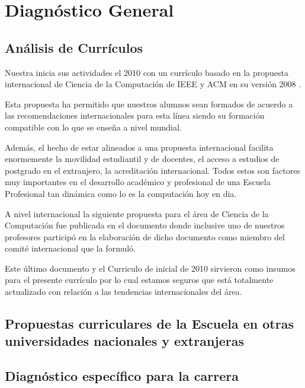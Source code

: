 \section{Diagnóstico General}

\subsection{Análisis de Currí­culos}
Nuestra \SchoolFullName inicia sus actividades el 2010 con un currí­culo basado en la propuesta internacional de 
Ciencia de la Computación de IEEE y ACM en su versión 2008 \cite{ComputerScience2008}.

Esta propuesta ha permitido que nuestros alumnos sean formados de acuerdo a las recomendaciones internacionales para esta lí­nea
siendo su formación compatible con lo que se enseña a nivel mundial.

Además, el hecho de estar alineados a una propuesta internacional facilita enormemente la movilidad estudiantil y de docentes,
el acceso a estudios de postgrado en el extranjero, la acreditación internacional. Todos estos son factores muy importantes en el 
desarrollo académico y profesional de una Escuela Profesional tan dinámica como lo es la computación hoy en dia.

A nivel internacional la siguiente propuesta para el área de Ciencia de la Computación fue publicada en el documento \cite{CS2013} donde 
inclusive uno de nuestros profesores participó en la elaboración de dicho documento como miembro del comité internacional que la formuló.

Este último documento \cite{CS2013} y el Curriculo de inicial de 2010 sirvieron como insumos para el presente currí­culo 
por lo cual estamos seguros que está totalmente actualizado con relación a las tendencias internacionales del área.

\subsection{Propuestas curriculares de la Escuela en otras universidades nacionales y extranjeras}


\subsection{Diagnóstico especí­fico para la carrera}

